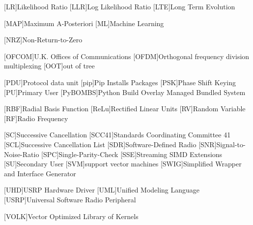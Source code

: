 \begin{acronym}[TROLLLLL]
  [LR]{Likelihood Ratio}
  [LLR]{Log Likelihood Ratio}
  [LTE]{Long Term Evolution}

  [MAP]{Maximum A-Posteriori}
  [ML]{Machine Learning}

  [NRZ]{Non-Return-to-Zero}

  [OFCOM]{U.K. Offices of Communications}
  [OFDM]{Orthogonal frequency division multiplexing}
  [OOT]{out of tree}

  [PDU]{Protocol data unit}
  [pip]{Pip Installs Packages}
  [PSK]{Phase Shift Keying}
  [PU]{Primary User}
  [PyBOMBS]{Python Build Overlay Managed Bundled System}

  [RBF]{Radial Basis Function}
  [ReLu]{Rectified Linear Units}
  [RV]{Random Variable}
  [RF]{Radio Frequency}

  [SC]{Successive Cancellation}
  [SCC41]{Standards Coordinating Committee 41}
  [SCL]{Successive Cancellation List}
  [SDR]{Software-Defined Radio}
  [SNR]{Signal-to-Noise-Ratio}
  [SPC]{Single-Parity-Check}
  [SSE]{Streaming SIMD Extensions}
  [SU]{Secondary User}
  [SVM]{support vector machines}
  [SWIG]{Simplified Wrapper and Interface Generator}

 [UHD]{\ac{USRP} Hardware Driver\texttrademark}
 [UML]{Unified Modeling Language}
 [USRP]{Universal Software Radio Peripheral}

 [VOLK]{Vector Optimized Library of Kernels}
\end{acronym}
